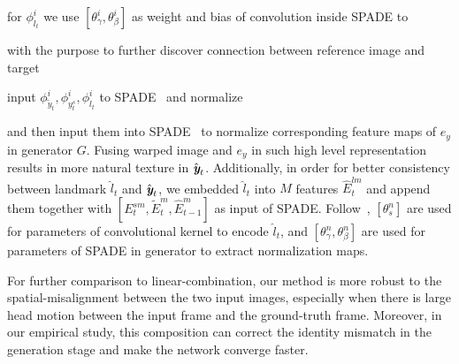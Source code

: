 \documentclass[runningheads]{llncs}
\def\mathbi#1{\textbf{\em #1}}
\begin{document}
for $\phi^i_{l_t}$ we use $[\theta_\gamma^i,\theta_\beta^i]$ as weight and bias of convolution inside SPADE to 

with the purpose to further discover connection between reference image and target

input $\phi^i_{\tilde{y}_t}, \phi^i_{{y}^s_t}, \phi^i_{l_t}$ to SPADE~\cite{park2019semantic} and normalize 
 
 and then input them into SPADE~\cite{park2019semantic} to normalize corresponding feature maps of $e_y$ in generator $G$. Fusing warped image and $e_y$ in such high level representation results in more natural texture in $\hat{\mathbi{y}}_{t}$. Additionally, in order for better consistency between landmark $\hat{l}_t$ and $\hat{\mathbi{y}}_{t}$, we embedded $\hat{l}_t$ into $M$ features $\hat{E}_t^{lm}$ and append them together with $[E_t^{sm},\tilde{E}_t^m, \hat{E}_{t-1}^m]$ as input of SPADE. Follow~\cite{wang2018fewshotvid2vid}, $[\theta_s^n]$ are used for parameters of convolutional kernel to encode $\hat{l}_t$, and $[\theta_\gamma^n, \theta_\beta^n]$ are used for parameters of SPADE in generator to extract normalization maps.

 For further comparison to linear-combination, our method is more robust to the spatial-misalignment between the two input images, especially when there is large head motion between the input frame and the ground-truth frame. Moreover, in our empirical study, this composition can correct the identity mismatch in the generation stage and make the network converge faster.
\end{document}
